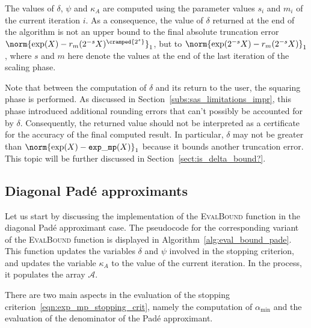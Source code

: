 \begin{oss}\label{oss:delta_not_upper_bound}
	The values of $\delta$, $\psi$ and $\kappa_A$ are computed using the parameter values $s_i$ and $m_i$ of the current iteration $i$. As a consequence, the value of $\delta$ returned at the end of the algorithm is not an upper bound to the final absolute truncation error $\norm{\exp(X)-r_m(2^{-s}X)^{\cramped{2^s}}}_1$, but to $\norm{\exp(2^{-s}X)-r_m(2^{-s}X)}_1$, where $s$ and $m$ here denote the values at the end of the last iteration of the scaling phase.
	
	Note that between the computation of $\delta$ and its return to the user, the squaring phase is performed. As discussed in Section~\ref{subs:sas_limitations_impr}, this phase introduced additional rounding errors that can't possibly be accounted for by $\delta$. Consequently, the returned value should not be interpreted as a certificate for the accuracy of the final computed result. In particular, $\delta$ may not be greater than $\norm{\exp(X)-\mathtt{exp\_mp}(X)}_1$ because it bounds another truncation error.
	This topic will be further discussed in Section~\ref{sect:is_delta_bound?}.
\end{oss}

\subsection{Diagonal Padé approximants}\label{subs:evalBound_pade}
Let us start by discussing the implementation of the \textsc{EvalBound} function in the diagonal Padé approximant case. 
The pseudocode for the corresponding variant of the \textsc{EvalBound} function is displayed in Algorithm~\ref{alg:eval_bound_pade}. 
This function updates the variables $\delta$ and $\psi$ involved in the stopping criterion, and updates the variable $\kappa_A$ to the value of the current iteration. In the process, it populates the array $\mathcal{A}$.

There are two main aspects in the evaluation of the stopping criterion~\eqref{eqn:exp_mp_stopping_crit}, namely the computation of $\alpha_{\min}$ and the evaluation of the denominator of the Padé approximant.

